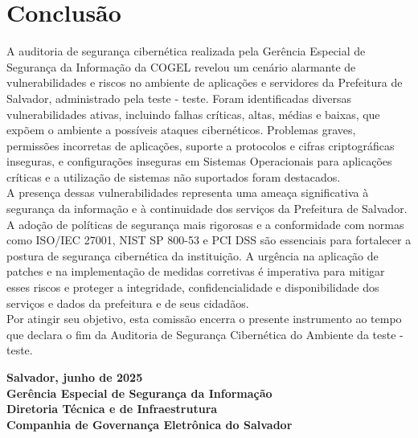 \documentclass[a4paper,12pt]{article}
\begin{document}
\section{Conclusão}

A auditoria de segurança cibernética realizada pela Gerência Especial de Segurança da Informação da COGEL revelou um cenário alarmante de vulnerabilidades e riscos no ambiente de aplicações e servidores da Prefeitura de Salvador, administrado pela  teste - teste. Foram identificadas diversas vulnerabilidades ativas, incluindo falhas críticas, altas, médias e baixas, que expõem o ambiente a possíveis ataques cibernéticos. Problemas graves, permissões incorretas de aplicações, suporte a protocolos e cifras criptográficas inseguras, e configurações inseguras em Sistemas Operacionais para aplicações críticas e a utilização de sistemas não suportados foram destacados.\\

A presença dessas vulnerabilidades representa uma ameaça significativa à segurança da informação e à continuidade dos serviços da Prefeitura de Salvador. A adoção de políticas de segurança mais rigorosas e a conformidade com normas como ISO/IEC 27001, NIST SP 800-53 e PCI DSS são essenciais para fortalecer a postura de segurança cibernética da instituição. A urgência na aplicação de patches e na implementação de medidas corretivas é imperativa para mitigar esses riscos e proteger a integridade, confidencialidade e disponibilidade dos serviços e dados da prefeitura e de seus cidadãos.\\

Por atingir seu objetivo, esta comissão encerra o presente instrumento ao tempo que declara o fim da Auditoria de Segurança Cibernética do Ambiente da teste - teste.

\newpage

\vspace*{\fill} %
\begin{flushright}
\textbf{Salvador, junho de 2025 \\%
Gerência Especial de Segurança da Informação \\%
Diretoria Técnica e de Infraestrutura \\%
Companhia de Governança Eletrônica do Salvador}
\end{flushright}
\end{document}
